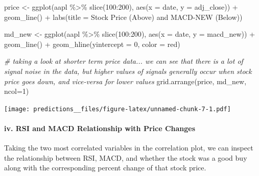\documentclass[
]{article}
\newenvironment{Shaded}{\begin{snugshade}}{\end{snugshade}}
\newcommand{\AttributeTok}[1]{\textcolor[rgb]{0.77,0.63,0.00}{#1}}
\newcommand{\CommentTok}[1]{\textcolor[rgb]{0.56,0.35,0.01}{\textit{#1}}}
\newcommand{\DecValTok}[1]{\textcolor[rgb]{0.00,0.00,0.81}{#1}}
\newcommand{\FunctionTok}[1]{\textcolor[rgb]{0.00,0.00,0.00}{#1}}
\newcommand{\NormalTok}[1]{#1}
\newcommand{\OtherTok}[1]{\textcolor[rgb]{0.56,0.35,0.01}{#1}}
\newcommand{\SpecialCharTok}[1]{\textcolor[rgb]{0.00,0.00,0.00}{#1}}
\newcommand{\StringTok}[1]{\textcolor[rgb]{0.31,0.60,0.02}{#1}}
\begin{document}
\begin{Shaded}
\begin{Highlighting}[]
\NormalTok{price }\OtherTok{\textless{}{-}} \FunctionTok{ggplot}\NormalTok{(aapl }\SpecialCharTok{\%\textgreater{}\%} \FunctionTok{slice}\NormalTok{(}\DecValTok{100}\SpecialCharTok{:}\DecValTok{200}\NormalTok{), }\FunctionTok{aes}\NormalTok{(}\AttributeTok{x =}\NormalTok{ date, }\AttributeTok{y =}\NormalTok{ adj\_close)) }\SpecialCharTok{+}
  \FunctionTok{geom\_line}\NormalTok{() }\SpecialCharTok{+} 
  \FunctionTok{labs}\NormalTok{(}\AttributeTok{title =} \StringTok{\textquotesingle{}Stock Price (Above) and MACD{-}NEW (Below)\textquotesingle{}}\NormalTok{)}

\NormalTok{md\_new }\OtherTok{\textless{}{-}} \FunctionTok{ggplot}\NormalTok{(aapl }\SpecialCharTok{\%\textgreater{}\%} \FunctionTok{slice}\NormalTok{(}\DecValTok{100}\SpecialCharTok{:}\DecValTok{200}\NormalTok{), }\FunctionTok{aes}\NormalTok{(}\AttributeTok{x =}\NormalTok{ date, }\AttributeTok{y =}\NormalTok{ macd\_new)) }\SpecialCharTok{+}
  \FunctionTok{geom\_line}\NormalTok{() }\SpecialCharTok{+}
  \FunctionTok{geom\_hline}\NormalTok{(}\AttributeTok{yintercept =} \DecValTok{0}\NormalTok{, }\AttributeTok{color =} \StringTok{\textquotesingle{}red\textquotesingle{}}\NormalTok{)}

\CommentTok{\# taking a look at shorter term price data... we can see that there is a lot of signal noise in the data, but higher values of signals generally occur when stock price goes down, and vice{-}versa for lower values}
\FunctionTok{grid.arrange}\NormalTok{(price, md\_new, }\AttributeTok{ncol=}\DecValTok{1}\NormalTok{)}
\end{Highlighting}
\end{Shaded}

\texttt{[image: predictions\_\_files/figure-latex/unnamed-chunk-7-1.pdf]}

\hypertarget{iv.-rsi-and-macd-relationship-with-price-changes}{%
\paragraph{iv. RSI and MACD Relationship with Price
Changes}\label{iv.-rsi-and-macd-relationship-with-price-changes}}

Taking the two most correlated variables in the correlation plot, we can
inspect the relationship between RSI, MACD, and whether the stock was a
good buy along with the corresponding percent change of that stock
price.
\end{document}
